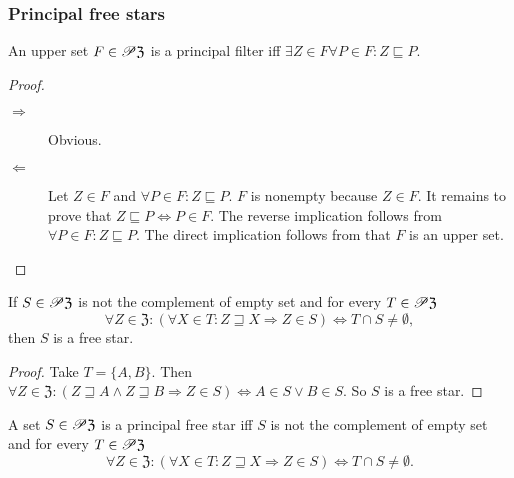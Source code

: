 \subsubsection{Principal free stars}
\begin{prop}
An upper set $F\in\mathscr{P}\mathfrak{Z}$ is a principal filter iff
$\exists Z\in F\forall P\in F:Z\sqsubseteq P$.\end{prop}
\begin{proof}
~
\begin{description}
\item [{$\Rightarrow$}] Obvious.
\item [{$\Leftarrow$}] Let $Z\in F$ and $\forall P\in F:Z\sqsubseteq P$.
$F$ is nonempty because $Z\in F$. It remains to prove that $Z\sqsubseteq P\Leftrightarrow P\in F$.
The reverse implication follows from $\forall P\in F:Z\sqsubseteq P$.
The direct implication follows from that $F$ is an upper set.
\end{description}
\end{proof}
\begin{lem}
If $S\in\mathscr{P}\mathfrak{Z}$ is not the complement of empty set and for every $T\in\mathscr{P}\mathfrak{Z}$
\[
\forall Z\in\mathfrak{Z}:(\forall X\in T:Z\sqsupseteq X\Rightarrow Z\in S)\Leftrightarrow T\cap S\neq\emptyset,
\]
then $S$ is a free star.\end{lem}
\begin{proof}
Take $T=\{A,B\}$. Then $\forall Z\in\mathfrak{Z}:(Z\sqsupseteq A\wedge Z\sqsupseteq B\Rightarrow Z\in S)\Leftrightarrow A\in S\vee B\in S$.
So $S$ is a free star.\end{proof}
\begin{prop}
A set $S\in\mathscr{P}\mathfrak{Z}$ is a principal free star iff $S$
is not the complement of empty set and for every $T\in\mathscr{P}\mathfrak{Z}$
\[
\forall Z\in\mathfrak{Z}:(\forall X\in T:Z\sqsupseteq X\Rightarrow Z\in S)\Leftrightarrow T\cap S\neq\emptyset.
\]
\end{prop}
